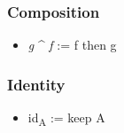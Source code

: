 \documentclass[11pt]{article}
\begin{document}
\subsubsection{Composition}
\label{sec:org979a4dd}
\begin{itemize}
\item \emph{g} \^{} \emph{f} := f then g
\end{itemize}

\subsubsection{Identity}
\label{sec:orgdaae927}
\begin{itemize}
\item id\textsubscript{A} := keep A
\end{itemize}
\end{document}
